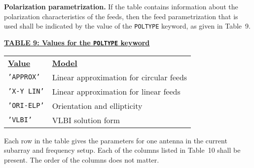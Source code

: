 \documentclass[twoside]{article}
\begin{document}
{\bf Polarization parametrization.} If the table contains information
about the polarization characteristics of the feeds, then the feed
parametrization that is used shall be indicated by the value of the
{\tt POLTYPE} keyword, as given in Table~9.

\begin{center}
\underline{\bf{TABLE 9: Values for the {\tt POLTYPE} keyword}}\\
\begin{tabular}{ll}
\noalign{\vspace{2pt}} \label{ta:ANpoltypes}
\underline{{\bf Value\vphantom{y}}} & \underline{\bf{Model\vphantom{y}}} \\
\noalign{\vspace{2pt}}
{\tt 'APPROX'}  & Linear approximation for circular feeds \\
{\tt 'X-Y LIN'} & Linear approximation for linear feeds \\
{\tt 'ORI-ELP'} & Orientation and ellipticity \\
{\tt 'VLBI'}    & VLBI solution form
\end{tabular}
\end{center}

Each row in the table gives the parameters for one antenna in the
current subarray and frequency setup.  Each of the columns listed in
Table~10 shall be present.  The order of the columns does not matter.
\vfill\eject
\end{document}

